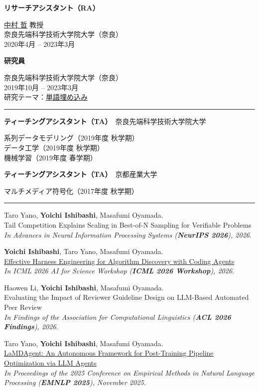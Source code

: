 \documentclass[11pt,a4paper]{article}
\let\oldhref\href
\renewcommand{\href}[2]{\oldhref{#1}{\uline{#2}}}
\newlength{\labelcol}\setlength{\labelcol}{1.2in}
\newlength{\labelgap}\setlength{\labelgap}{0.21in}
\newcommand{\cvsection}[1]{%
  \par\vspace{26pt}%
  {\noindent\rule{\textwidth}{2.4pt}\par}\nopagebreak\vspace{9pt}%
  \noindent\llap{\smash[b]{\parbox[t]{\labelcol}{\raggedright\large\bfseries #1}}\hspace{\labelgap}}\ignorespaces}
\newcommand{\entry}[1]{\par\vspace{10pt}\noindent\textbf{#1}\par\nopagebreak}
\newenvironment{indented}{%
  \par\nopagebreak
  \begin{list}{}{\setlength{\leftmargin}{0.3in}\setlength{\topsep}{1pt}%
    \setlength{\partopsep}{0pt}\setlength{\itemsep}{0pt}\setlength{\parsep}{1pt}}\item[]}{\end{list}}
\newcommand{\paper}[3]{\par\vspace{12pt}\noindent #1\\ #2\\ {\itshape #3}\par}
\newcommand{\paperfirst}[3]{#1\\ #2\\ {\itshape #3}\par}
\begin{document}
\entry{リサーチアシスタント（RA）}
\begin{indented}
\href{https://ahcweb01.naist.jp/Prof.Nakamura/index_e.html}{中村 哲} 教授\\
奈良先端科学技術大学院大学（奈良）\\
2020年4月 -- 2023年3月
\end{indented}

\entry{研究員}
\begin{indented}
奈良先端科学技術大学院大学（奈良）\\
2019年10月 -- 2023年3月\\
研究テーマ：\href{https://arxiv.org/abs/2210.13034}{単語埋め込み}
\end{indented}

\cvsection{教育歴}%
\textbf{ティーチングアシスタント（TA）}　奈良先端科学技術大学院大学
\begin{indented}
系列データモデリング（2019年度 秋学期）\\
データ工学（2019年度 秋学期）\\
機械学習（2019年度 春学期）
\end{indented}

\vspace{6pt}
\textbf{ティーチングアシスタント（TA）}　京都産業大学
\begin{indented}
マルチメディア符号化（2017年度 秋学期）
\end{indented}

\cvsection{研究論文}%
\paperfirst{Taro Yano, \textbf{Yoichi Ishibashi}, Masafumi Oyamada.}
{Tail Competition Explains Scaling in Best-of-N Sampling for Verifiable Problems}
{In Advances in Neural Information Processing Systems (\textbf{NeurIPS 2026}), 2026.}

\paper{\textbf{Yoichi Ishibashi}, Taro Yano, Masafumi Oyamada.}
{\href{https://arxiv.org/abs/2605.15221}{Effective Harness Engineering for Algorithm Discovery with Coding Agents}}
{In ICML 2026 AI for Science Workshop (\textbf{ICML 2026 Workshop}), 2026.}

\paper{Haowen Li, \textbf{Yoichi Ishibashi}, Masafumi Oyamada.}
{Evaluating the Impact of Reviewer Guideline Design on LLM-Based Automated Peer Review}
{In Findings of the Association for Computational Linguistics (\textbf{ACL 2026 Findings}), 2026.}

\paper{Taro Yano, \textbf{Yoichi Ishibashi}, Masafumi Oyamada.}
{\href{https://arxiv.org/abs/2505.21963}{LaMDAgent: An Autonomous Framework for Post-Training Pipeline Optimization via LLM Agents}}
{In Proceedings of the 2025 Conference on Empirical Methods in Natural Language Processing (\textbf{EMNLP 2025}), November 2025.}
\end{document}
